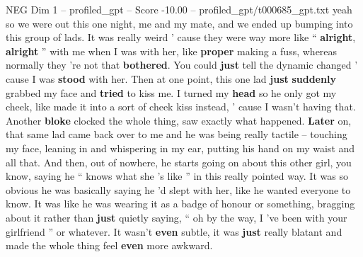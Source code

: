 \begin{textsample}{NEG Dim 1 – profiled\_gpt – Score -10.00 – profiled\_gpt/t000685\_gpt.txt}  \label{ex:f1_neg_002}
yeah so we were out this one night, me and my mate, and we ended up bumping into this group of lads.
It was really weird ’ cause they were way more like “ \textbf{alright}, \textbf{alright} ” with me when I was with her, like \textbf{proper} making a fuss, whereas normally they ’re not that \textbf{bothered}.
You could \textbf{just} tell the dynamic changed ’ cause I was \textbf{stood} with her.
Then at one point, this one lad \textbf{just} \textbf{suddenly} grabbed my face and \textbf{tried} to kiss me.
I turned my \textbf{head} so he only got my cheek, like made it into a sort of cheek kiss instead, ’ cause I wasn't having that.
Another \textbf{bloke} clocked the whole thing, saw exactly what happened. \textbf{Later} on, that same lad came back over to me and he was being really tactile – touching my face, leaning in and whispering in my ear, putting his hand on my waist and all that.
And then, out of nowhere, he starts going on about this other girl, you know, saying he “ knows what she ’s like ” in this really pointed way.
It was so obvious he was basically saying he ’d slept with her, like he wanted everyone to know.
It was like he was wearing it as a badge of honour or something, bragging about it rather than \textbf{just} quietly saying, “ oh by the way, I ’ve been with your girlfriend ” or whatever.
It wasn't \textbf{even} subtle, it was \textbf{just} really blatant and made the whole thing feel \textbf{even} more awkward.

\end{textsample}
